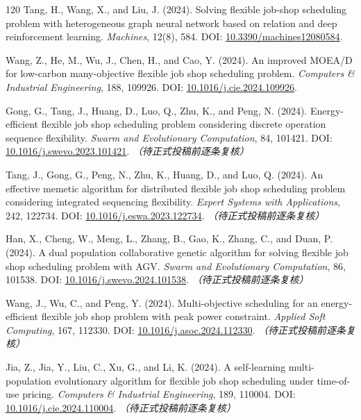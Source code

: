 \documentclass[UTF8,a4paper,11pt]{ctexart}
\begin{document}
\begin{thebibliography}{120}
Tang, H., Wang, X., and Liu, J. (2024). Solving flexible job-shop scheduling problem with heterogeneous graph neural network based on relation and deep reinforcement learning. \emph{Machines}, 12(8), 584.
\newblock DOI: \href{https://doi.org/10.3390/machines12080584}{10.3390/machines12080584}.

Wang, Z., He, M., Wu, J., Chen, H., and Cao, Y. (2024). An improved MOEA/D for low-carbon many-objective flexible job shop scheduling problem. \emph{Computers \& Industrial Engineering}, 188, 109926.
\newblock DOI: \href{https://doi.org/10.1016/j.cie.2024.109926}{10.1016/j.cie.2024.109926}.

Gong, G., Tang, J., Huang, D., Luo, Q., Zhu, K., and Peng, N. (2024). Energy-efficient flexible job shop scheduling problem considering discrete operation sequence flexibility. \emph{Swarm and Evolutionary Computation}, 84, 101421.
\newblock DOI: \href{https://doi.org/10.1016/j.swevo.2023.101421}{10.1016/j.swevo.2023.101421}. \textit{（待正式投稿前逐条复核）}

Tang, J., Gong, G., Peng, N., Zhu, K., Huang, D., and Luo, Q. (2024). An effective memetic algorithm for distributed flexible job shop scheduling problem considering integrated sequencing flexibility. \emph{Expert Systems with Applications}, 242, 122734.
\newblock DOI: \href{https://doi.org/10.1016/j.eswa.2023.122734}{10.1016/j.eswa.2023.122734}. \textit{（待正式投稿前逐条复核）}

Han, X., Cheng, W., Meng, L., Zhang, B., Gao, K., Zhang, C., and Duan, P. (2024). A dual population collaborative genetic algorithm for solving flexible job shop scheduling problem with AGV. \emph{Swarm and Evolutionary Computation}, 86, 101538.
\newblock DOI: \href{https://doi.org/10.1016/j.swevo.2024.101538}{10.1016/j.swevo.2024.101538}. \textit{（待正式投稿前逐条复核）}

Wang, J., Wu, C., and Peng, Y. (2024). Multi-objective scheduling for an energy-efficient flexible job shop problem with peak power constraint. \emph{Applied Soft Computing}, 167, 112330.
\newblock DOI: \href{https://doi.org/10.1016/j.asoc.2024.112330}{10.1016/j.asoc.2024.112330}. \textit{（待正式投稿前逐条复核）}

Jia, Z., Jia, Y., Liu, C., Xu, G., and Li, K. (2024). A self-learning multi-population evolutionary algorithm for flexible job shop scheduling under time-of-use pricing. \emph{Computers \& Industrial Engineering}, 189, 110004.
\newblock DOI: \href{https://doi.org/10.1016/j.cie.2024.110004}{10.1016/j.cie.2024.110004}. \textit{（待正式投稿前逐条复核）}


\end{thebibliography}
\end{document}

